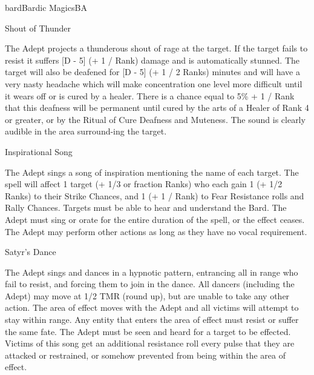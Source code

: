 \begin{College}[2.1]{bard}{Bardic Magics}{BA}
\begin{spell}[S-7]{Shout of Thunder}
\begin{effects}
The Adept projects a thunderous shout of rage at the target. If the
target fails to resist it suffers [D - 5] (+ 1 / Rank) damage and is
automatically stunned.  The target will also be deafened for [D - 5]
(+ 1 / 2 Ranks) minutes and will have a very nasty headache which will
make concentration one level more difficult until it wears off or is
cured by a healer. There is a chance equal to 5\% + 1 / Rank that this
deafness will be permanent until cured by the arts of a Healer of Rank
4 or greater, or by the Ritual of Cure Deafness and Muteness.  The
sound is clearly audible in the area surround-ing the target.
\end{effects}
\end{spell}

\begin{spell}[S-8]{Inspirational Song}

\begin{effects}
The Adept sings a song of inspiration mentioning the name of each
target.  The spell will affect 1 target (+ 1/3 or fraction Ranks) who
each gain 1 (+ 1/2 Ranks) to their Strike Chances, and 1 (+ 1 / Rank)
to Fear Resistance rolls and Rally Chances.  Targets must be able to
hear and understand the Bard.  The Adept must sing or orate for the
entire duration of the spell, or the effect ceases.  The Adept may
perform other actions as long as they have no vocal requirement.
\end{effects}
\end{spell}

\begin{spell}[S-9]{Satyr’s Dance}

\begin{effects}
The Adept sings and dances in a hypnotic pattern, entrancing all in
range who fail to resist, and forcing them to join in the dance.  All
dancers (including the Adept) may move at 1/2 TMR (round up), but are
unable to take any other action.  The area of effect moves with the
Adept and all victims will attempt to stay within range.  Any entity
that enters the area of effect must resist or suffer the same fate.
The Adept must be seen and heard for a target to be effected.  Victims
of this song get an additional resistance roll every pulse that they
are attacked or restrained, or somehow prevented from being within the
area of effect.
\end{effects}
\end{spell}


\end{College}
